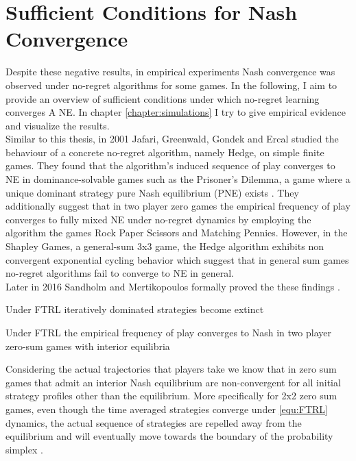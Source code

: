 \section{Sufficient Conditions for Nash Convergence}\label{section:SufficientConditionsForNash Convergence}

Despite these negative results, in empirical experiments Nash convergence was observed under no-regret algorithms for some games. In the following, I aim to provide an overview of sufficient conditions under which no-regret learning converges A NE. In chapter \ref{chapter:simulations} I try to give empirical evidence and visualize the results. \\

Similar to this thesis, in 2001 Jafari, Greenwald, Gondek and Ercal studied the behaviour of a concrete no-regret algorithm, namely Hedge, on simple finite games. They found that the algorithm's induced sequence of play converges to NE in dominance-solvable games such as the Prisoner's Dilemma, a game where a unique dominant strategy pure Nash equilibrium (PNE) exists \cite{jafari}. They additionally suggest that in two player zero games the empirical frequency of play converges to fully mixed NE under no-regret dynamics by employing the algorithm the games Rock Paper Scissors and Matching Pennies. However, in the Shapley Games, a general-sum 3x3 game, the Hedge algorithm exhibits non convergent exponential cycling behavior \cite{jafari} which suggest that in general sum games no-regret algorithms fail to converge to NE in general.\\

Later in 2016 Sandholm and Mertikopoulos formally proved the these findings \cite[Theorem 4.1 and Theorem 6.1]{sandholm}.

\begin{proposition}\label{prop:dominantedStrategiesExtinct}
    Under FTRL iteratively dominated strategies become extinct
\end{proposition}

\begin{proposition}\label{prop:empiricalFrequencyConvergence}
    Under FTRL the empirical frequency of play converges to Nash in two player zero-sum games with interior equilibria
\end{proposition}

Considering the actual trajectories that players take we know that in zero sum games that admit an interior Nash equilibrium are non-convergent for all initial strategy profiles other than the equilibrium. More specifically for 2x2 zero sum games, even though the time averaged strategies converge under \ref{equ:FTRL} dynamics, the actual sequence of strategies are repelled away from the equilibrium and will eventually move towards the boundary of the probability simplex \cite[Theorem 1]{bailey}.

